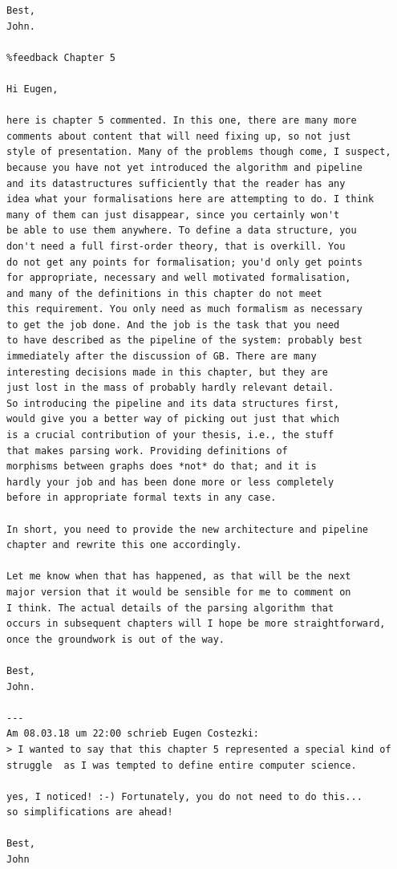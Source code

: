 \begin{Verbatim}
Best,
John.

%feedback Chapter 5

Hi Eugen,

here is chapter 5 commented. In this one, there are many more
comments about content that will need fixing up, so not just
style of presentation. Many of the problems though come, I suspect,
because you have not yet introduced the algorithm and pipeline
and its datastructures sufficiently that the reader has any
idea what your formalisations here are attempting to do. I think
many of them can just disappear, since you certainly won't
be able to use them anywhere. To define a data structure, you
don't need a full first-order theory, that is overkill. You
do not get any points for formalisation; you'd only get points
for appropriate, necessary and well motivated formalisation,
and many of the definitions in this chapter do not meet
this requirement. You only need as much formalism as necessary
to get the job done. And the job is the task that you need
to have described as the pipeline of the system: probably best
immediately after the discussion of GB. There are many
interesting decisions made in this chapter, but they are
just lost in the mass of probably hardly relevant detail.
So introducing the pipeline and its data structures first,
would give you a better way of picking out just that which
is a crucial contribution of your thesis, i.e., the stuff
that makes parsing work. Providing definitions of
morphisms between graphs does *not* do that; and it is
hardly your job and has been done more or less completely
before in appropriate formal texts in any case.

In short, you need to provide the new architecture and pipeline
chapter and rewrite this one accordingly.

Let me know when that has happened, as that will be the next
major version that it would be sensible for me to comment on
I think. The actual details of the parsing algorithm that
occurs in subsequent chapters will I hope be more straightforward,
once the groundwork is out of the way.

Best,
John.

---
Am 08.03.18 um 22:00 schrieb Eugen Costezki:
> I wanted to say that this chapter 5 represented a special kind of struggle  as I was tempted to define entire computer science.

yes, I noticed! :-) Fortunately, you do not need to do this...
so simplifications are ahead!

Best,
John

\end{Verbatim}